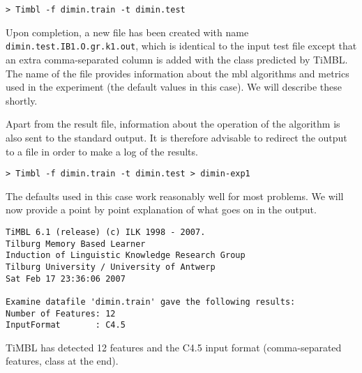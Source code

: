 \documentclass{report}
\begin{document}
{\footnotesize
\begin{verbatim}
> Timbl -f dimin.train -t dimin.test
\end{verbatim}
}

Upon completion, a new file has been created with name {\small\tt
dimin.test.IB1.O.gr.k1.out}, which is identical to the
input test file except that an extra comma-separated column is added
with the class predicted by TiMBL. The name of the file provides
information about the {\sc mbl} algorithms and metrics used in the
experiment (the default values in this case). We will describe these
shortly.

Apart from the result file, information about the operation of the
algorithm is also sent to the standard output. It is therefore 
advisable to redirect the output to a file in order to make a log of
the results.

{\footnotesize
\begin{verbatim}
> Timbl -f dimin.train -t dimin.test > dimin-exp1
\end{verbatim}
}

The defaults used in this case work reasonably well for most problems.  We
will now provide a point by point explanation of what goes on in the
output.



{\footnotesize
\begin{verbatim}
TiMBL 6.1 (release) (c) ILK 1998 - 2007.
Tilburg Memory Based Learner
Induction of Linguistic Knowledge Research Group
Tilburg University / University of Antwerp
Sat Feb 17 23:36:06 2007

Examine datafile 'dimin.train' gave the following results:
Number of Features: 12
InputFormat       : C4.5
\end{verbatim}
}



TiMBL has detected 12 features and the C4.5 input format
(comma-separated features, class at the end).

\end{document}
